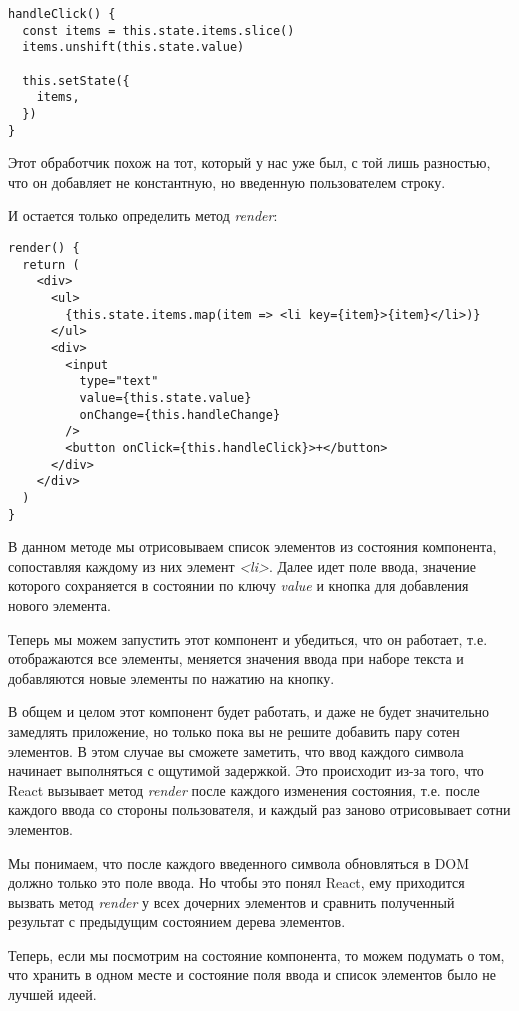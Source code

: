\begin{lstlisting}
handleClick() {
  const items = this.state.items.slice()
  items.unshift(this.state.value)
  
  this.setState({
    items,
  })
}
\end{lstlisting}

Этот обработчик похож на тот, который у нас уже был, с той лишь разностью, что он добавляет не константную, но введенную пользователем строку.

И остается только определить метод \textit{render}:

\begin{lstlisting}
render() {
  return (
    <div>
      <ul>
        {this.state.items.map(item => <li key={item}>{item}</li>)}
      </ul>
      <div>
        <input
          type="text"
          value={this.state.value}
          onChange={this.handleChange}
        />
        <button onClick={this.handleClick}>+</button>
      </div>
    </div>
  )
}
\end{lstlisting}

В данном методе мы отрисовываем список элементов из состояния компонента, сопоставляя каждому из них элемент \textit{<li>}. Далее идет поле ввода, значение которого сохраняется в состоянии по ключу \textit{value} и кнопка для добавления нового элемента.

Теперь мы можем запустить этот компонент и убедиться, что он работает, т.е. отображаются все элементы, меняется значения ввода при наборе текста и добавляются новые элементы по нажатию на кнопку.

В общем и целом этот компонент будет работать, и даже не будет значительно замедлять приложение, но только пока вы не решите добавить пару сотен элементов. В этом случае вы сможете заметить, что ввод каждого символа начинает выполняться с ощутимой задержкой. Это происходит из-за того, что React вызывает метод \textit{render} после каждого изменения состояния, т.е. после каждого ввода со стороны пользователя, и каждый раз заново отрисовывает сотни элементов.

Мы понимаем, что после каждого введенного символа обновляться в DOM должно только это поле ввода. Но чтобы это понял React, ему приходится вызвать метод \textit{render} у всех дочерних элементов и сравнить полученный результат с предыдущим состоянием дерева элементов.

Теперь, если мы посмотрим на состояние компонента, то можем подумать о том, что хранить в одном месте и состояние поля ввода и список элементов было не лучшей идеей.

